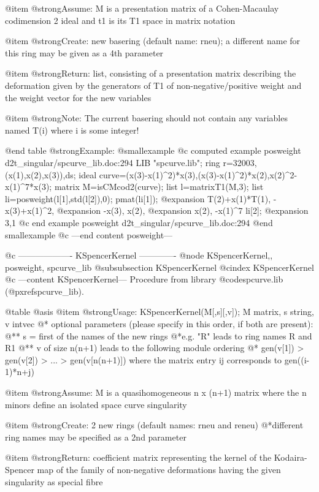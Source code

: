 @item @strong{Assume:}
M is a presentation matrix of a Cohen-Macaulay codimension 2
ideal and t1 is its T1 space in matrix notation

@item @strong{Create:}
new basering (default name: rneu); a different name for this ring
may be given as a 4th parameter

@item @strong{Return:}
list, consisting of a presentation matrix describing the deformation
given by the generators of T1 of non-negative/positive weight
and the weight vector for the new variables

@item @strong{Note:}
The current basering should not contain any variables named
T(i) where i is some integer!

@end table
@strong{Example:}
@smallexample
@c computed example posweight d2t_singular/spcurve_lib.doc:294 
LIB "spcurve.lib";
ring r=32003,(x(1),x(2),x(3)),ds;
ideal curve=(x(3)-x(1)^2)*x(3),(x(3)-x(1)^2)*x(2),x(2)^2-x(1)^7*x(3);
matrix M=isCMcod2(curve);
list l=matrixT1(M,3);
list li=posweight(l[1],std(l[2]),0);
pmat(li[1]);
@expansion{} T(2)+x(1)*T(1), -x(3)+x(1)^2, 
@expansion{} -x(3),          x(2),         
@expansion{} x(2),           -x(1)^7
li[2];
@expansion{} 3,1
@c end example posweight d2t_singular/spcurve_lib.doc:294
@end smallexample
@c ---end content posweight---

@c ------------------- KSpencerKernel -------------
@node KSpencerKernel,, posweight, spcurve_lib
@subsubsection KSpencerKernel
@cindex KSpencerKernel
@c ---content KSpencerKernel---
Procedure from library @code{spcurve.lib} (@pxref{spcurve_lib}).

@table @asis
@item @strong{Usage:}
KSpencerKernel(M[,s][,v]); M matrix, s string, v intvec @*
optional parameters (please specify in this order, if both are
present):
@** s = first of the names of the new rings
@*e.g. "R" leads to ring names R and R1
@** v of size n(n+1) leads to the following module ordering @*
gen(v[1]) > gen(v[2]) > ... > gen(v[n(n+1)]) where the matrix
entry ij corresponds to gen((i-1)*n+j)

@item @strong{Assume:}
M is a quasihomogeneous n x (n+1) matrix where the n minors define
an isolated space curve singularity

@item @strong{Create:}
2 new rings (default names: rneu and reneu)
@*different ring names may be specified as a 2nd parameter

@item @strong{Return:}
coefficient matrix representing the kernel of the Kodaira-
Spencer map of the family of non-negative deformations
having the given singularity as special fibre

